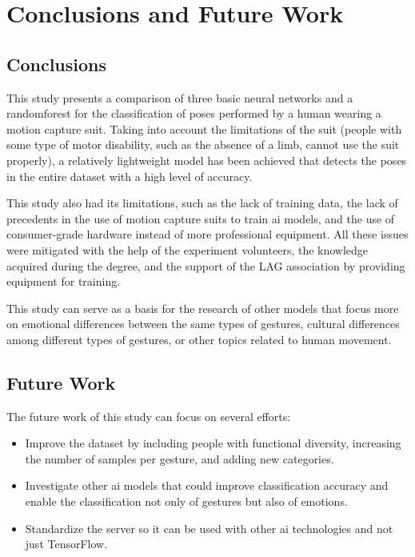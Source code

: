 \chapter*{Conclusions and Future Work}
\label{cap:conclusions}
\section{Conclusions}

This study presents a comparison of three basic neural networks and a \gls{randomforest} for the classification of poses performed by a human wearing a motion capture suit. Taking into account the limitations of the suit (people with some type of motor disability, such as the absence of a limb, cannot use the suit properly), a relatively lightweight model has been achieved that detects the poses in the entire dataset with a high level of accuracy.

This study also had its limitations, such as the lack of training data, the lack of precedents in the use of motion capture suits to train \gls{ai} models, and the use of consumer-grade hardware instead of more professional equipment. All these issues were mitigated with the help of the experiment volunteers, the knowledge acquired during the degree, and the support of the LAG association by providing equipment for training.

This study can serve as a basis for the research of other models that focus more on emotional differences between the same types of gestures, cultural differences among different types of gestures, or other topics related to human movement.

\section{Future Work}

The future work of this study can focus on several efforts:
\begin{itemize}
    \item Improve the dataset by including people with functional diversity, increasing the number of samples per gesture, and adding new categories.
    \item Investigate other \gls{ai} models that could improve classification accuracy and enable the classification not only of gestures but also of emotions.
    \item Standardize the server so it can be used with other \gls{ai} technologies and not just TensorFlow.
\end{itemize}


